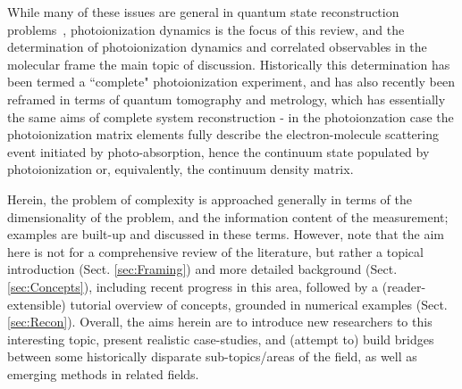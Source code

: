 \documentclass[10pt]{article}
\begin{document}
While many of these issues are general in quantum state reconstruction problems~\cite{Fano1957}, photoionization dynamics is the focus of this review, and the determination of photoionization dynamics and correlated observables in the molecular frame the main topic of discussion. Historically this determination has been termed a ``complete" photoionization experiment, and has also recently been reframed in terms of quantum tomography and metrology, which has essentially the same aims of complete system reconstruction - in the photoionzation case the photoionization matrix elements fully describe the electron-molecule scattering event initiated by photo-absorption, hence the continuum state populated by photoionization or, equivalently, the continuum density matrix.

Herein, the problem of complexity is approached generally in terms of the dimensionality of the problem, and the information content of the measurement; examples are built-up and discussed in these terms. However, note that the aim here is not for a comprehensive review of the literature, but rather a topical introduction (Sect. \ref{sec:Framing}) and more detailed background (Sect. \ref{sec:Concepts}), including recent progress in this area, followed by a (reader-extensible) tutorial overview of concepts, grounded in numerical examples (Sect. \ref{sec:Recon}). Overall, the aims herein are to introduce new researchers to this interesting topic, present realistic case-studies, and (attempt to) build bridges between some historically disparate sub-topics/areas of the field, as well as emerging methods in related fields.

\end{document}

